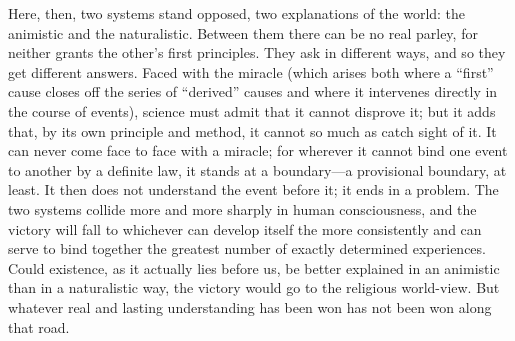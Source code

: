 \documentclass[12pt,a4paper]{article}
\begin{document}
Here, then, two systems stand opposed, two explanations of the world: the animistic
and the naturalistic. Between them there can be no real parley, for neither grants
the other's first principles. They ask in different ways, and so they get different
answers. Faced with the miracle (which arises both where a ``first'' cause closes
off the series of ``derived'' causes and where it intervenes directly in the course
of events), science must admit that it cannot disprove it; but it adds that, by its
own principle and method, it cannot so much as catch sight of it. It can never come
face to face with a miracle; for wherever it cannot bind one event to another by a
definite law, it stands at a boundary---a provisional boundary, at least. It then
does not understand the event before it; it ends in a problem. The two systems
collide more and more sharply in human consciousness, and the victory will fall to
whichever can develop itself the more consistently and can serve to bind together
the greatest number of exactly determined experiences. Could existence, as it
actually lies before us, be better explained in an animistic than in a naturalistic
way, the victory would go to the religious world-view. But whatever real and lasting
understanding has been won has not been won along that road.
\end{document}
